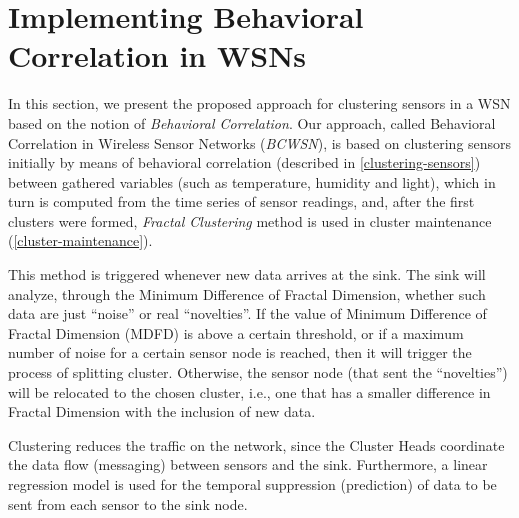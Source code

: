 \documentclass{acm_proc_article-sp}
\begin{document}
\section{Implementing Behavioral Correlation in WSNs}
\label{implementing-bcwsn}

In this section, we present the proposed approach for clustering sensors in a
WSN based on the notion of {\it Behavioral Correlation}. Our approach, called
Behavioral Correlation in Wireless Sensor Networks (\textit{BCWSN}),
is based on clustering sensors initially by means of behavioral correlation
(described in \ref{clustering-sensors}) between gathered variables (such as
temperature, humidity and light), which in turn is computed from the time series
of sensor readings, and, after the first clusters were formed, \textit{Fractal
Clustering} method is used in cluster maintenance (\ref{cluster-maintenance}).

This method is triggered whenever new data arrives at the sink.
The sink will analyze, through the Minimum Difference of Fractal Dimension,
whether such data are just ``noise'' or real ``novelties''. If the
value of Minimum Difference of Fractal Dimension (MDFD) is above a certain threshold, or
if a maximum number of noise for a certain sensor node is reached, then it
will trigger the process of splitting cluster. Otherwise, the sensor node
(that sent the ``novelties'') will be relocated to the chosen cluster, i.e., one that
has a smaller difference in Fractal Dimension with the inclusion of new data.

Clustering reduces the traffic on the network, since the Cluster Heads
coordinate the data flow (messaging) between sensors and the sink.
Furthermore, a linear regression model is used for the temporal suppression
(prediction) of data to be sent from each sensor to the sink node.
\end{document}
